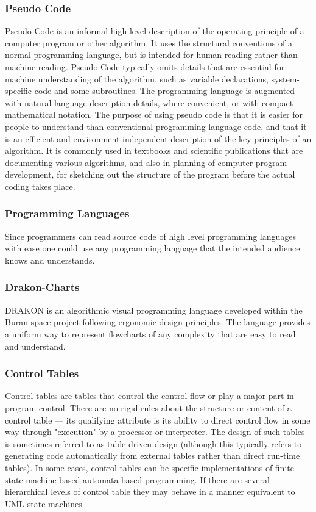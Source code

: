 \documentclass[12pt,a4paper]{book}
\begin{document}
\subsubsection{Pseudo Code}
Pseudo Code is an informal high-level description of the operating principle of a computer program or other algorithm. It uses the structural conventions of a normal programming language, but is intended for human reading rather than machine reading. Pseudo Code typically omits details that are essential for machine understanding of the algorithm, such as variable declarations, system-specific code and some subroutines. The programming language is augmented with natural language description details, where convenient, or with compact mathematical notation. The purpose of using pseudo code is that it is easier for people to understand than conventional programming language code, and that it is an efficient and environment-independent description of the key principles of an algorithm. It is commonly used in textbooks and scientific publications that are documenting various algorithms, and also in planning of computer program development, for sketching out the structure of the program before the actual coding takes place.
\subsubsection{Programming Languages}
Since programmers can read source code of high level programming languages with ease one could use any programming language that the intended audience knows and understands.
\subsubsection{Drakon-Charts}
DRAKON is an algorithmic visual programming language developed within the Buran space project following ergonomic design principles. The language provides a uniform way to represent flowcharts of any complexity that are easy to read and understand.
\subsubsection{Control Tables}
Control tables are tables that control the control flow or play a major part in program control. There are no rigid rules about the structure or content of a control table — its qualifying attribute is its ability to direct control flow in some way through "execution" by a processor or interpreter. The design of such tables is sometimes referred to as table-driven design (although this typically refers to generating code automatically from external tables rather than direct run-time tables). In some cases, control tables can be specific implementations of finite-state-machine-based automata-based programming. If there are several hierarchical levels of control table they may behave in a manner equivalent to UML state machines
\end{document}
